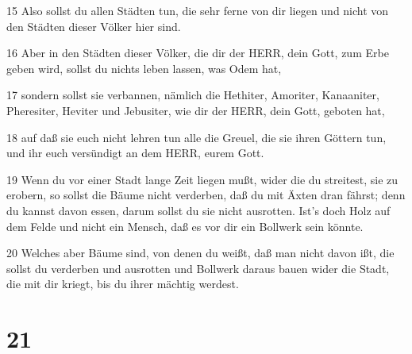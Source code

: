 \par 15 Also sollst du allen Städten tun, die sehr ferne von dir liegen und nicht von den Städten dieser Völker hier sind.
\par 16 Aber in den Städten dieser Völker, die dir der HERR, dein Gott, zum Erbe geben wird, sollst du nichts leben lassen, was Odem hat,
\par 17 sondern sollst sie verbannen, nämlich die Hethiter, Amoriter, Kanaaniter, Pheresiter, Heviter und Jebusiter, wie dir der HERR, dein Gott, geboten hat,
\par 18 auf daß sie euch nicht lehren tun alle die Greuel, die sie ihren Göttern tun, und ihr euch versündigt an dem HERR, eurem Gott.
\par 19 Wenn du vor einer Stadt lange Zeit liegen mußt, wider die du streitest, sie zu erobern, so sollst die Bäume nicht verderben, daß du mit Äxten dran fährst; denn du kannst davon essen, darum sollst du sie nicht ausrotten. Ist's doch Holz auf dem Felde und nicht ein Mensch, daß es vor dir ein Bollwerk sein könnte.
\par 20 Welches aber Bäume sind, von denen du weißt, daß man nicht davon ißt, die sollst du verderben und ausrotten und Bollwerk daraus bauen wider die Stadt, die mit dir kriegt, bis du ihrer mächtig werdest.

\chapter{21}

